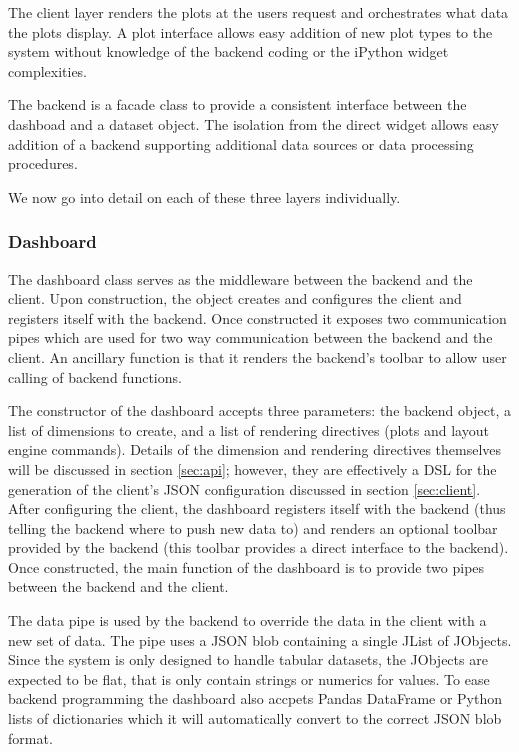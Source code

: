 \documentclass[letter,twocolumn]{article}
\begin{document}
The client layer renders the plots at the users request and orchestrates what data the plots display.
A plot interface allows easy addition of new plot types to the system without knowledge of the backend coding or the iPython widget complexities.

The backend is a facade class to provide a consistent interface between the dashboad and a dataset object.
The isolation from the direct widget allows easy addition of a backend supporting additional data sources or data processing procedures.

We now go into detail on each of these three layers individually.

\subsubsection{Dashboard}\label{sec:dashboard}

The dashboard class serves as the middleware between the backend and the client.
Upon construction, the object creates and configures the client and registers itself with the backend.
Once constructed it exposes two communication pipes which are used for two way communication between the backend and the client.
An ancillary function is that it renders the backend's toolbar to allow user calling of backend functions.

The constructor of the dashboard accepts three parameters: the backend object, a list of dimensions to create, and a list of rendering directives (plots and layout engine commands).
Details of the dimension and rendering directives themselves will be discussed in section \ref{sec:api}; however, they are effectively a DSL for the generation of the client's JSON configuration discussed in section \ref{sec:client}.
After configuring the client, the dashboard registers itself with the backend (thus telling the backend where to push new data to) and renders an optional toolbar provided by the backend (this toolbar provides a direct interface to the backend).
Once constructed, the main function of the dashboard is to provide two pipes between the backend and the client.

The data pipe is used by the backend to override the data in the client with a new set of data.  
The pipe uses a JSON blob containing a single JList of JObjects.
Since the system is only designed to handle tabular datasets, the JObjects are expected to be flat, that is only contain strings or numerics for values.
To ease backend programming the dashboard also accpets Pandas DataFrame or Python lists of dictionaries which it will automatically convert to the correct JSON blob format.
\end{document}
